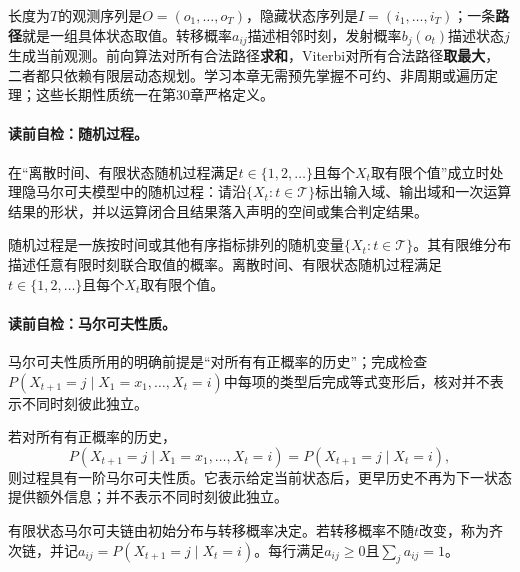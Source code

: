 \begin{keypointbox}[title=有限状态序列概念桥]
长度为$T$的观测序列是$O=(o_1,\ldots,o_T)$，隐藏状态序列是$I=(i_1,\ldots,i_T)$；一条\textbf{路径}就是一组具体状态取值。转移概率$a_{ij}$描述相邻时刻，发射概率$b_j(o_t)$描述状态$j$生成当前观测。前向算法对所有合法路径\textbf{求和}，Viterbi对所有合法路径\textbf{取最大}，二者都只依赖有限层动态规划。学习本章无需预先掌握不可约、非周期或遍历定理；这些长期性质统一在第30章严格定义。
\end{keypointbox}

\paragraph{读前自检：随机过程。}在“离散时间、有限状态随机过程满足$t\in\{1,2,\ldots\}$且每个$X_t$取有限个值”成立时处理隐马尔可夫模型中的随机过程：请沿$\{X_t:t\in\mathcal T\}$标出输入域、输出域和一次运算结果的形状，并以运算闭合且结果落入声明的空间或集合判定结果。\par

\begin{definition}[随机过程]
随机过程是一族按时间或其他有序指标排列的随机变量$\{X_t:t\in\mathcal T\}$。其有限维分布描述任意有限时刻联合取值的概率。离散时间、有限状态随机过程满足$t\in\{1,2,\ldots\}$且每个$X_t$取有限个值。
\end{definition}

\paragraph{读前自检：马尔可夫性质。}马尔可夫性质所用的明确前提是“对所有有正概率的历史”；完成检查$P(X_{t+1}=j\mid X_1=x_1,\ldots,X_t=i)$中每项的类型后完成等式变形后，核对并不表示不同时刻彼此独立。\par

\begin{definition}[一阶马尔可夫性质]\label{def:V3-C05-markov}
若对所有有正概率的历史，
\[
P(X_{t+1}=j\mid X_1=x_1,\ldots,X_t=i)
=P(X_{t+1}=j\mid X_t=i),
\]
则过程具有一阶马尔可夫性质。它表示给定当前状态后，更早历史不再为下一状态提供额外信息；并不表示不同时刻彼此独立。
\end{definition}

有限状态马尔可夫链由初始分布与转移概率决定。若转移概率不随$t$改变，称为齐次链，并记$a_{ij}=P(X_{t+1}=j\mid X_t=i)$。每行满足$a_{ij}\geq0$且$\sum_ja_{ij}=1$。

